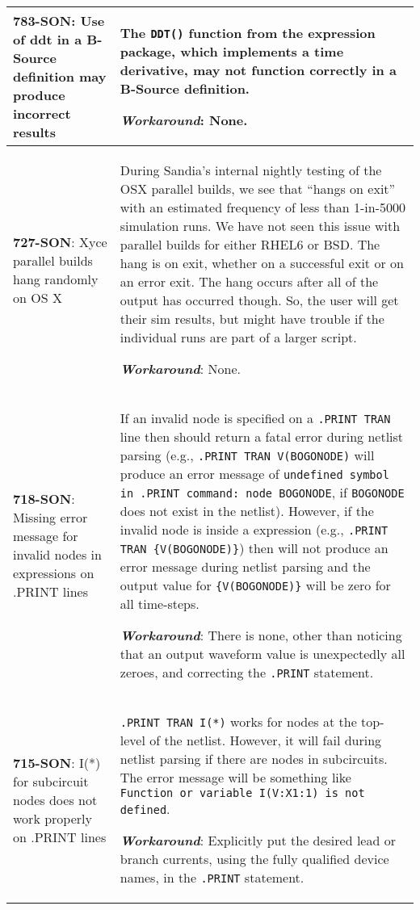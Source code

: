 {\begin{longtable}[h] {>{\raggedright\small}m{2in}|>{\raggedright\let\\\tabularnewline\small}m{3.5in}}
\textbf{783-SON}: Use of ddt in a B-Source definition may produce incorrect results  & The \texttt{DDT()} 
function from the \Xyce{} expression package, which implements a time derivative, may not function 
correctly in a B-Source definition.

\textbf{\textit{Workaround}}: None. \\ \hline

\textbf{727-SON}: Xyce parallel builds hang randomly on OS X & During Sandia's internal 
nightly testing of the OSX parallel builds, we see that \Xyce{} ``hangs on exit'' with an 
estimated frequency of less than 1-in-5000 simulation runs.  We have not seen this issue 
with parallel builds for either RHEL6 or BSD.  The hang is on exit, whether on a successful 
exit or on an error exit.  The hang occurs after all of the \Xyce{} output has occurred though.  
So, the user will get their sim results, but might have trouble if the individual \Xyce{} runs 
are part of a larger script.

\textbf{\textit{Workaround}}: None. \\ \hline

\textbf{718-SON}: Missing error message for invalid nodes in expressions on .PRINT lines & If an invalid node
is specified on a \Xyce{} \texttt{.PRINT TRAN} line then \Xyce{} should return a fatal error during netlist
parsing (e.g., \texttt{.PRINT TRAN V(BOGONODE)} will produce an error message of \texttt{undefined 
symbol in .PRINT command: node BOGONODE}, if \texttt{BOGONODE} does not exist in the netlist).  However, if the
invalid node is inside a \Xyce{} expression (e.g., \texttt{.PRINT TRAN \{V(BOGONODE)\}}) then \Xyce{} will 
not produce an error message during netlist parsing and the output value for \texttt{\{V(BOGONODE)\}} will 
be zero for all time-steps.

\textbf{\textit{Workaround}}: There is none, other than noticing that an output waveform value is 
unexpectedly all zeroes, and correcting the \texttt{.PRINT} statement. \\ \hline

\textbf{715-SON}: I(*) for subcircuit nodes does not work properly on .PRINT lines & 
\texttt{.PRINT TRAN I(*)} works for nodes at the top-level of the netlist.  However, it will
fail during netlist parsing if there are nodes in subcircuits.  The error message will be 
something like \texttt{Function or variable I(V:X1:1) is not defined}.

\textbf{\textit{Workaround}}: Explicitly put the desired lead or branch currents, using the
fully qualified device names, in the \texttt{.PRINT} statement. \\ \hline


\end{longtable}}

